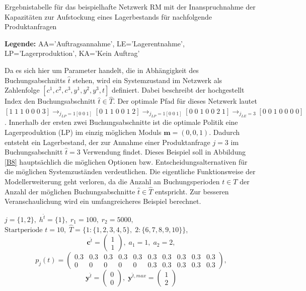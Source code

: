 \begin{table}
\begin{footnotesize}
    \caption{Ergebnistabelle für das beispielhafte Netzwerk RM mit der Inanspruchnahme der Kapazitäten zur Aufstockung eines Lagerbestands für nachfolgende Produktanfragen} \label{Tab8}
    \vspace*{3mm}
    \begin{center}
      {\footnotesize \textbf{Legende:} AA='Auftragsannahme', LE='Lagerentnahme', LP='Lagerproduktion', KA='Kein Auftrag'} 
      \end{center}
\end{footnotesize}
\end{table}

Da es sich hier um Parameter handelt, die in Abhängigkeit des Buchungsabschnitts $\hat{t}$ stehen, wird ein Systemzustand im Netzwerk als Zahlenfolge $[c^1,c^2,c^3,y^1,y^2,y^3,t]$ definiert. Dabei beschreibt der hochgestellt Index den Buchungsabschnitt $\hat{t}\in\hat{T}$. Der optimale Pfad für dieses Netzwerk lautet $[1\;1\;1\;0\;0\;0\;3] \rightarrow_{j_{LP}=1[0\;0\;1]} [0\;1\;1\;0\;0\;1\;2] \rightarrow_{j_{LP}=1[0\;0\;1]}  [0\;0\;1\;0\;0\;2\;1]  \rightarrow_{j_{LE}=3} [0\;0\;1\;0\;0\;0\;0]$. Innerhalb der ersten zwei Buchungsabschnitte ist die optimale Politik eine Lagerproduktion (LP) im einzig möglichen Moduls $\textbf{m}=(0,0,1)$. Dadurch entsteht ein Lagerbestand, der zur Annahme einer Produktanfrage $j=3$ im Buchungsabschnitt $\hat{t}=3$ Verwendung findet. Dieses Beispiel soll in Abbildung \ref{B8} hauptsächlich die möglichen Optionen bzw. Entscheidungsalternativen für die möglichen Systemzuständen verdeutlichen. Die eigentliche Funktionsweise der Modellerweiterung geht verloren, da die Anzahl an Buchungsperioden $t\in T$ der Anzahl der möglichen Buchungsabschnitte $\hat{t}\in\hat{T}$ entspricht. Zur besseren Veranschaulichung wird ein umfangreicheres Beispiel berechnet.
\begin{center}
$j = \{1, 2\}, \; h^{\hat{t}} = \{1\}, \; r_{1} = 100, \; r_{2} = 5000,$ \\
$\text{Startperiode } t=10, \; \hat{T}= \{1: \{1,2,3,4,5\},\; 2: \{6,7,8,9,10\}\}  $,
\[\textbf{c}^{\hat{t}}=\begin{pmatrix} 1\\ 1  \end{pmatrix}, \;
    a_{1}=1, \;
       a_{2}=2,   \]
         \[ p_{j}(t)=
       \begin{pmatrix}
       0.3 & 0.3 & 0.3 & 0.3 & 0.3 & 0.3 & 0.3 & 0.3 & 0.3 & 0.3\\
0 & 0 & 0 & 0 & 0 & 0.3 & 0.3 & 0.3 & 0.3 & 0.3
\end{pmatrix}, 
  \]
  \[
    \textbf{y}^{\hat{t}}= \begin{pmatrix} 0\\ 0\end{pmatrix}, \;
    \textbf{y}^{\hat{t},max}=\begin{pmatrix} 1\\ 2  \end{pmatrix}
      \]
\end{center}

